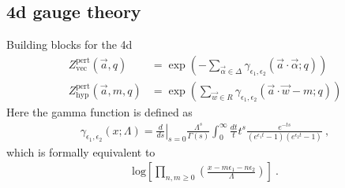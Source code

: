 \documentclass[letterpaper, 11pt]{article}
\def\a{\alpha}
\def\e{\epsilon}
\begin{document}
\subsection{4d gauge theory}
Building blocks for the 4d
\begin{align}
 Z_{\textrm{vec}}^{\textrm{pert}}(\vec{a}, q) &= \exp \left( - \sum_{\vec \a \in \Delta} \gamma_{\e_1, \e_2}  (\vec{a} \cdot {\vec{\a}}; q )\right) \\
 Z_{\textrm{hyp}}^{\textrm{pert}} (\vec{a}, m, q)&= \exp \left( \sum_{\vec{w} \in R} \gamma_{\e_1, \e_2} ( \vec{a} \cdot {\vec{w}} - m; q)\right)
\end{align}
Here the gamma function is defined as
\begin{align}
 \gamma_{\e_1, \e_2} (x; \Lambda) = \left. \frac{d}{ds} \right|_{s=0} \frac{\Lambda^s}{\Gamma(s)} \int_0^{\infty} \frac{dt}{t} t^s \frac{e^{-ts}}{(e^{\e_1 t} - 1)(e^{\e_2 t} - 1)} \ , 
\end{align}
which is formally equivalent to 
\begin{align}
 \textrm{log} \left[\prod_{n, m\ge 0} \left( \frac{x - m\e_1 - n \e_2}{\Lambda} \right) \right] \ . 
\end{align}
\end{document}
